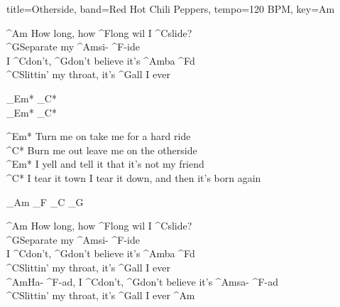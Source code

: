 \documentclass[titlepage]{article}
\begin{document}
\begin{song}{title=Otherside, band=Red Hot Chili Peppers, tempo=120 BPM, key=Am}
	\begin{chorus}
		^{Am}{ } How long, how ^{F}long wil I ^{C}slide? \\
		^{G}Separate my ^{Am}si- ^{F}-ide \\
		I ^{C}don't, ^{G}don't believe it's ^{Am}ba ^{F}d \\
		^{C}Slittin' my throat, it's ^{G}all I ever
	\end{chorus}

	\begin{interlude}
		_Em* _C* \\
		_Em* _C*
	\end{interlude}

	\begin{bridge}
		^{Em*}{ } Turn me on take me for a hard ride \\
		^{C*} Burn me out leave me on the otherside \\
		^{Em*}{ } I yell and tell it that it's not my friend \\
		^{C*} I tear it town I tear it down, and then it's born again
	\end{bridge}

	\begin{solo}
		_{Am} _{F} _{C} _{G}
	\end{solo}

	\begin{chorus}
		^{Am}{ } How long, how ^{F}long wil I ^{C}slide? \\
		^{G}Separate my ^{Am}si- ^{F}-ide \\
		I ^{C}don't, ^{G}don't believe it's ^{Am}ba ^{F}d \\
		^{C}Slittin' my throat, it's ^{G}all I ever \\
		^{Am}Ha- ^{F}-ad, I ^{C}don't, ^{G}don't believe it's ^{Am}sa- ^{F}-ad \\
		^{C}Slittin' my throat, it's ^{G}all I ever ^{Am}
	\end{chorus}

\end{song}
\end{document}
